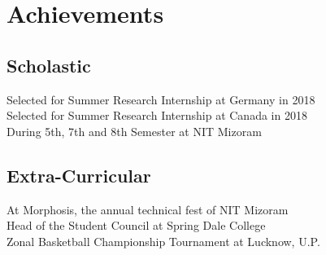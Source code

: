 
\section{Achievements} 
\subsection{Scholastic}
Selected for Summer Research Internship at Germany in 2018 \\
Selected for Summer Research Internship at Canada in 2018 \\
During 5th, 7th and 8th Semester at NIT Mizoram \\
\sectionsep

\subsection{Extra-Curricular}
At Morphosis, the annual technical fest of NIT Mizoram \\
Head of the Student Council at Spring Dale College \\
Zonal Basketball Championship Tournament at Lucknow, U.P. \\
\sectionsep